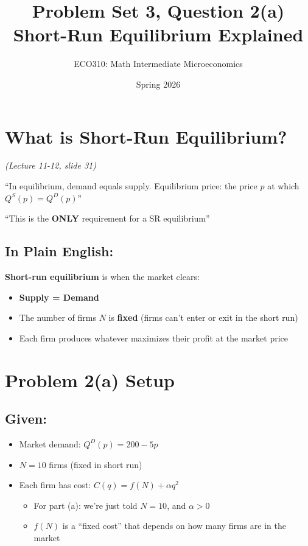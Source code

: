 \documentclass[11pt]{article}
\title{\textbf{Problem Set 3, Question 2(a)} \\ Short-Run Equilibrium Explained}
\author{ECO310: Math Intermediate Microeconomics}
\date{Spring 2026}
\begin{document}
\maketitle

\section{What is Short-Run Equilibrium?}
\textit{(Lecture 11-12, slide 31)}

\begin{tcolorbox}[colback=boxblue, colframe=blue!50!black, title=From the slides:]
``In equilibrium, demand equals supply. Equilibrium price: the price $p$ at which $Q^S(p) = Q^D(p)$''

\vspace{0.3cm}
``This is the \textbf{ONLY} requirement for a SR equilibrium''
\end{tcolorbox}

\subsection*{In Plain English:}

\textbf{Short-run equilibrium} is when the market clears:
\begin{itemize}[leftmargin=*]
    \item \textbf{Supply = Demand}
    \item The number of firms $N$ is \textbf{fixed} (firms can't enter or exit in the short run)
    \item Each firm produces whatever maximizes their profit at the market price
\end{itemize}

\section{Problem 2(a) Setup}

\subsection*{Given:}
\begin{itemize}[leftmargin=*]
    \item Market demand: $Q^D(p) = 200 - 5p$
    \item $N = 10$ firms (fixed in short run)
    \item Each firm has cost: $C(q) = f(N) + \alpha q^2$
    \begin{itemize}
        \item For part (a): we're just told $N = 10$, and $\alpha > 0$
        \item $f(N)$ is a ``fixed cost'' that depends on how many firms are in the market
    \end{itemize}
\end{itemize}
\end{document}
